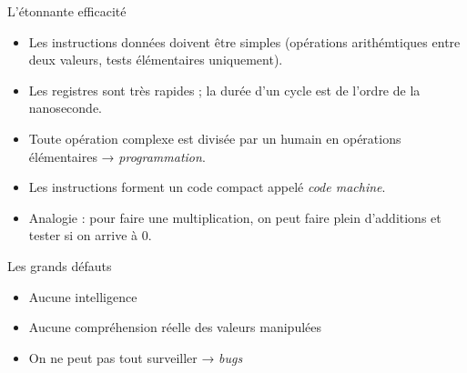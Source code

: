 \begin{frame}
  \begin{block}{L'étonnante efficacité}
    \begin{itemize}
    \item[\dialogwarning] Les instructions données doivent être simples (opérations arithémtiques entre deux valeurs, tests élémentaires uniquement).
    \item Les registres sont très rapides ; la durée d'un cycle est de l'ordre de la nanoseconde.
    \item Toute opération complexe est divisée par un humain en opérations élémentaires → \emph{programmation}.
    \item Les instructions forment un code compact appelé \emph{code machine}.
    \item[\dialogsystem] Analogie : pour faire une multiplication, on
      peut faire plein d'additions et tester si on arrive à 0.
    \end{itemize}
  \end{block}
  \begin{block}{Les grands défauts}
    \begin{itemize}
    \item[\dialogerror] Aucune intelligence
    \item[\dialogerror] Aucune compréhension réelle des valeurs manipulées
    \item[\dialogerror] On ne peut pas tout surveiller → \emph{bugs}
    \end{itemize}
  \end{block}
\end{frame}

